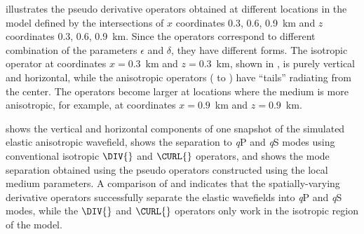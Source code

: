 illustrates the pseudo derivative operators obtained at different
locations in the model defined by the intersections of $x$ coordinates
0.3, 0.6, 0.9~km and $z$ coordinates 0.3, 0.6, 0.9~km. Since the
operators correspond to different combination of the parameters
$\epsilon$ and $\delta$, they have different forms. The isotropic
operator {at coordinates $x=0.3$~km and $z=0.3$~km, shown
in} , is purely vertical and horizontal, while
the anisotropic operators (
to ) have ``tails'' radiating from the
center. {The operators become larger at locations where the medium is
more anisotropic, for example, at coordinates $x=0.9$~km and
$z=0.9$~km.}

 shows the vertical and horizontal components of 
one snapshot of the simulated elastic anisotropic
 wavefield,  shows the separation to {\it q}P and
 {\it q}S modes using conventional {isotropic} $\DIV{}$ and $\CURL{}$ operators,
 and  shows the mode separation obtained using the
pseudo operators constructed using the local medium parameters. 
A comparison of  and  indicates
that the spatially-varying derivative operators successfully separate
the elastic wavefields into {\it q}P and {\it q}S modes, while the
$\DIV{}$ and $\CURL{}$ operators only work in the isotropic region of
the model.






